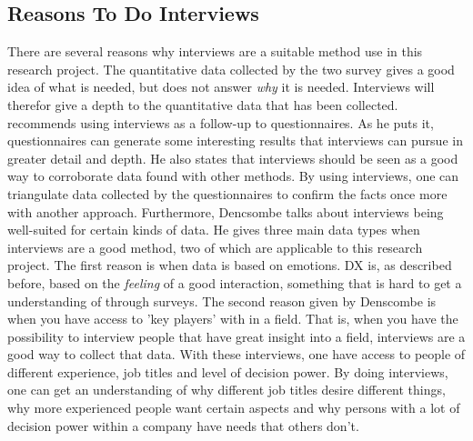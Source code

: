 \documentclass{cslthse-msc}
\begin{document}
    \subsection{Reasons To Do Interviews}
    There are several reasons why interviews are a suitable method use in this research project.
    The quantitative data collected
    by the two survey gives a good idea of what is needed, but does not answer \textit{why} it is needed.
    Interviews will therefor give a depth to the quantitative data that has been collected.
    \citet{denscombe} recommends using interviews as a follow-up to questionnaires. As he puts it,
    questionnaires can generate some interesting results that interviews can pursue
    in greater detail and depth. He also states that interviews should be seen as a good way
    to corroborate data found with other methods. By using interviews, one can triangulate data
    collected by the questionnaires to confirm the facts once more with another approach.
    Furthermore, Dencsombe talks about interviews being well-suited for certain kinds of data.
    He gives three main data types when interviews are a good method,
    two of which are applicable to this research project. The first reason is
    when data is based on emotions. DX is, as described before, based on the \textit{feeling}
    of a good interaction, something that is hard to get a understanding of through
    surveys. The second reason given by Denscombe is when you have access to 'key players'
    with in a field. That is, when you have the possibility to interview people
    that have great insight into a field, interviews are a good way to collect that data.
    With these interviews, one have access to people of different experience, job titles
    and level of decision power. By doing interviews, one can get an understanding
    of why different job titles desire different things, why more experienced people
    want certain aspects and why persons with a lot of decision power within a company
    have needs that others don't.
\end{document}
